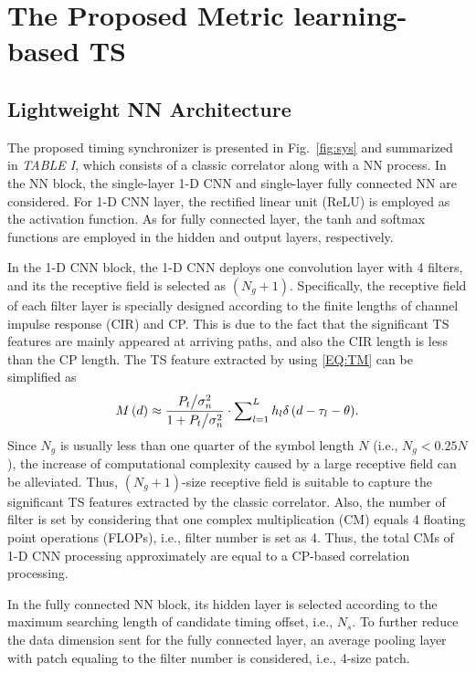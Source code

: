 \documentclass[conference]{IEEEtran}
\begin{document}
\section{The Proposed Metric learning-based TS}
\subsection{Lightweight NN Architecture}
The proposed timing synchronizer is presented in Fig.~\ref{fig:sys} and summarized in \emph{TABLE I}, which consists of a classic correlator along with a NN process.
In the NN block, the single-layer 1-D CNN and single-layer fully connected NN are considered.
For 1-D CNN layer, the rectified linear unit (ReLU) is employed as the activation function.
As for fully connected layer, the tanh and softmax functions are employed in the hidden and output layers, respectively.

In the 1-D CNN block, the 1-D CNN deploys one convolution layer with 4 filters, and its the receptive field is selected as $(N_g+1)$.
Specifically, the receptive field of each filter layer is specially designed according to the finite lengths of channel impulse response (CIR) and CP.
This is due to the fact that the significant TS features are mainly appeared at arriving paths, and also the CIR length is less than the CP length. The TS feature extracted by using \eqref{EQ:TM} can be simplified as
\begin{equation}\label{EQ:TM2}
M\left( d \right) \approx \frac{{{{{P_t}} \mathord{\left/
 {\vphantom {{{P_t}} {\sigma _n^2}}} \right.
 \kern-\nulldelimiterspace} {\sigma _n^2}}}}{{1 + {{{P_t}} \mathord{\left/
 {\vphantom {{{P_t}} {\sigma _n^2}}} \right.
 \kern-\nulldelimiterspace} {\sigma _n^2}}}}\cdot\sum\nolimits_{l = 1}^L {{h_l}\delta \left( {d - {\tau _l} - \theta } \right)} .
\end{equation}
Since $N_g$ is usually less than one quarter of the symbol length $N$ (i.e., $N_g<0.25N$), the increase of computational complexity caused by a large receptive field can be alleviated.
Thus, $(N_g+1)$-size receptive field is suitable to capture the significant TS features extracted by the classic correlator.
Also, the number of filter  is set by considering that one complex multiplication (CM) equals 4 floating point operations (FLOPs), i.e., filter number is set as 4.
Thus, the total CMs of 1-D CNN processing approximately are equal to a CP-based correlation processing.

In the fully connected NN block, its hidden layer is selected according to the maximum searching length of candidate timing offset, i.e., $N_s$.
To further reduce the data dimension sent for the fully connected layer, an average pooling layer with patch equaling to the filter number is considered, i.e., 4-size patch.
\end{document}
